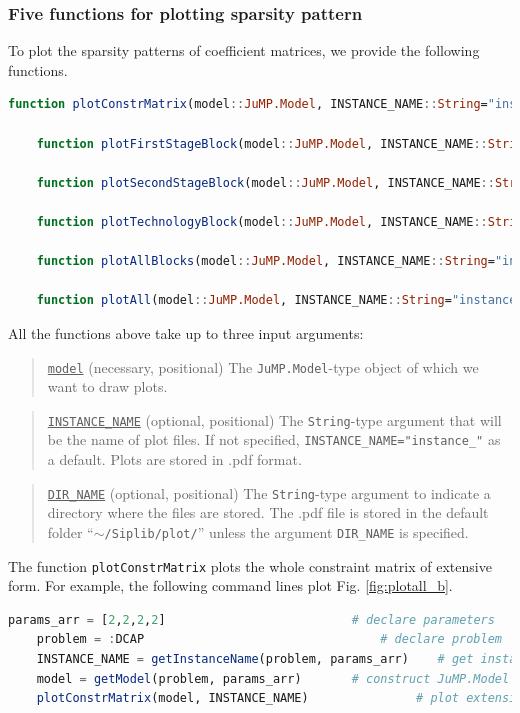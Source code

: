 \documentclass{hitec}
\newcommand{\jumpmodel}{\texttt{JuMP.Model}}
\begin{document}
	\subsubsection{Five functions for plotting sparsity pattern}
	To plot the sparsity patterns of coefficient matrices, we provide the following functions.
	\begin{lstlisting}[frame=single,language=julia]
	function plotConstrMatrix(model::JuMP.Model, INSTANCE_NAME::String="instance", DIR_NAME::String="$(dirname(@__FILE__))/../plot")
	
	function plotFirstStageBlock(model::JuMP.Model, INSTANCE_NAME::String="instance_block_A", DIR_NAME::String="$(dirname(@__FILE__))/../plot")
	
	function plotSecondStageBlock(model::JuMP.Model, INSTANCE_NAME::String="instance_block_W", DIR_NAME::String="$(dirname(@__FILE__))/../plot")
	
	function plotTechnologyBlock(model::JuMP.Model, INSTANCE_NAME::String="instance_block_T", DIR_NAME::String="$(dirname(@__FILE__))/../plot")
	
	function plotAllBlocks(model::JuMP.Model, INSTANCE_NAME::String="instance", DIR_NAME::String="$(dirname(@__FILE__))/../plot")
	
	function plotAll(model::JuMP.Model, INSTANCE_NAME::String="instance", DIR_NAME::String="$(dirname(@__FILE__))/../plot")
	\end{lstlisting}
	All the functions above take up to three input arguments:
	\begin{quote}
		\noindent\underline{\texttt{model}} (necessary, positional) The \jumpmodel-type object of which we want to draw plots.
	\end{quote}
	
	\begin{quote}
		\noindent\underline{\texttt{INSTANCE\_NAME}} (optional, positional) The \texttt{String}-type argument that will be the name of plot files. If not specified, \texttt{INSTANCE\_NAME="instance\_"} as a default. Plots are stored in .pdf format.
	\end{quote}
	
	\begin{quote}
		\noindent\underline{\texttt{DIR\_NAME}} (optional, positional) The \texttt{String}-type argument to indicate a directory where the files are stored. The .pdf file is stored in the default folder ``\texttt{$\sim$/Siplib/plot/}'' unless the argument \texttt{DIR\_NAME} is specified.
	\end{quote}
	The function \texttt{plotConstrMatrix} plots the whole constraint matrix of extensive form. For example, the following command lines plot Fig. \ref{fig:plotall_b}.
	\begin{lstlisting}[frame=single,language=julia]
	params_arr = [2,2,2,2]	                        # declare parameters
	problem = :DCAP	                                # declare problem
	INSTANCE_NAME = getInstanceName(problem, params_arr)	# get instance name
	model = getModel(problem, params_arr)	    # construct JuMP.Model object
	plotConstrMatrix(model, INSTANCE_NAME)               # plot extensive form constraint matrix   
	\end{lstlisting}
	
\end{document}
